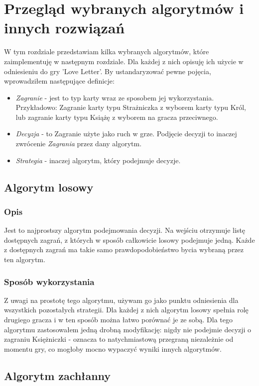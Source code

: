 \chapter{Przegląd wybranych algorytmów i innych rozwiązań}
\label{cha:rozdz3}

W tym rozdziale przedstawiam kilka wybranych algorytmów, które zaimplementuję w następnym rozdziale. Dla każdej z nich opisuję ich użycie w odniesieniu do gry 'Love Letter'. By ustandaryzować pewne pojęcia, wprowadziłem następujące definicje:
\begin{itemize}
	\item \textit{Zagranie} - jest to typ karty wraz ze sposobem jej wykorzystania. Przykładowo: Zagranie karty typu Strażniczka z wyborem karty typu Król, lub zagranie karty typu Książę z wyborem na gracza przeciwnego.
	\item \textit{Decyzja} - to Zagranie użyte jako ruch w grze. Podjęcie decyzji to inaczej zwrócenie \textit{Zagrania} przez dany algorytm.
	\item \textit{Strategia} - inaczej algorytm, który podejmuje decyzje. 
\end{itemize}

\section{Algorytm losowy}
\label{sec:algLos}
\subsection{Opis}
Jest to najprostszy algorytm podejmowania decyzji. Na wejściu otrzymuje listę dostępnych zagrań, z których w sposób całkowicie losowy podejmuje jedną. Każde z dostępnych zagrań ma takie samo prawdopodobieństwo bycia wybraną przez ten algorytm.

\subsection{Sposób wykorzystania}
Z uwagi na prostotę tego algorytmu, używam go jako punktu odniesienia dla wszystkich pozostałych strategii. Dla każdej z nich algorytm losowy spełnia rolę drugiego gracza i w ten sposób można łatwo porównać je ze sobą. Dla tego algorytmu zastosowałem jedną drobną modyfikację: nigdy nie podejmie decyzji o zagraniu Księżniczki - oznacza to natychmiastową przegraną niezależnie od momentu gry, co mogłoby mocno wypaczyć wyniki innych algorytmów.

\section{Algorytm zachłanny}
\label{sec:algZach}
